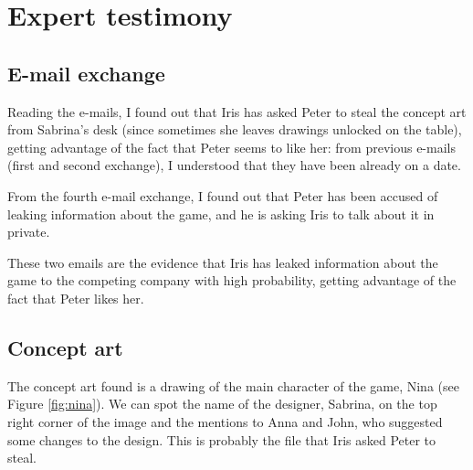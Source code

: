 \documentclass[12pt]{article}
\begin{document}
\section{Expert testimony}

\subsection{E-mail exchange}
\label{sec:mail}

Reading the e-mails, I found out that Iris has asked Peter to steal the concept art from Sabrina's desk (since sometimes she leaves drawings unlocked on the table), getting advantage of the fact that Peter seems to like her: from previous e-mails (first and second exchange), I understood that they have been already on a date.

From the fourth e-mail exchange, I found out that Peter has been accused of leaking information about the game, and he is asking Iris to talk about it in private.

These two emails are the evidence that Iris has leaked information about the game to the competing company with high probability, getting advantage of the fact that Peter likes her.

\subsection{Concept art}
\label{sec:art}

The concept art found is a drawing of the main character of the game, Nina (see Figure \ref{fig:nina}). We can spot the name of the designer, Sabrina, on the top right corner of the image and the mentions to Anna and John, who suggested some changes to the design. This is probably the file that Iris asked Peter to steal.
\end{document}
